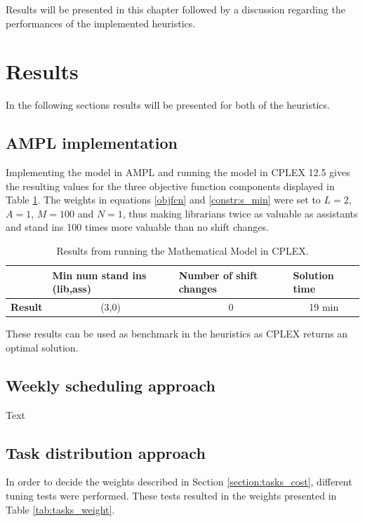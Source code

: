 Results will be presented in this chapter followed by a discussion regarding the performances of the implemented heuristics. 

\section{Results}
In the following sections results will be presented for both of the heuristics.

\subsection{AMPL implementation}

Implementing the model in AMPL and running the model in CPLEX 12.5 gives the resulting values for the three objective function components displayed in Table \ref{tab:CPLEX_res}. The weights in equations \ref{objfcn} and \ref{constr:s_min} were set to $L = 2$, $A = 1$, $M =100$ and $N=1$, thus making librarians twice as valuable as assistants and stand ins 100 times more valuable than no shift changes. 

\begin{table}[!h]
\centering
\label{tab:CPLEX_res}
\caption{Results from running the Mathematical Model in CPLEX.}
\begin{tabular}{|l|p{3cm}|p{3cm}|l|}
\hline
\rowcolor{Gray} & \textbf{Min num stand ins (lib,ass)} & \textbf{Number of shift changes} & \textbf{Solution time} \\ \hline
\cellcolor{Gray} \textbf{Result} & \multicolumn{1}{c|}{(3,0)} & \multicolumn{1}{c|}{0} & \multicolumn{1}{c|}{19 min} \\
\hline
\end{tabular}
\end{table}

These results can be used as benchmark in the heuristics as CPLEX returns an optimal solution. 

\subsection{Weekly scheduling approach}
Text

\subsection{Task distribution approach}\label{sec:task_dist_res}

In order to decide the weights described in Section \ref{section:tasks_cost}, different tuning tests were performed. These tests resulted in the weights presented in Table \ref{tab:tasks_weight}. 

